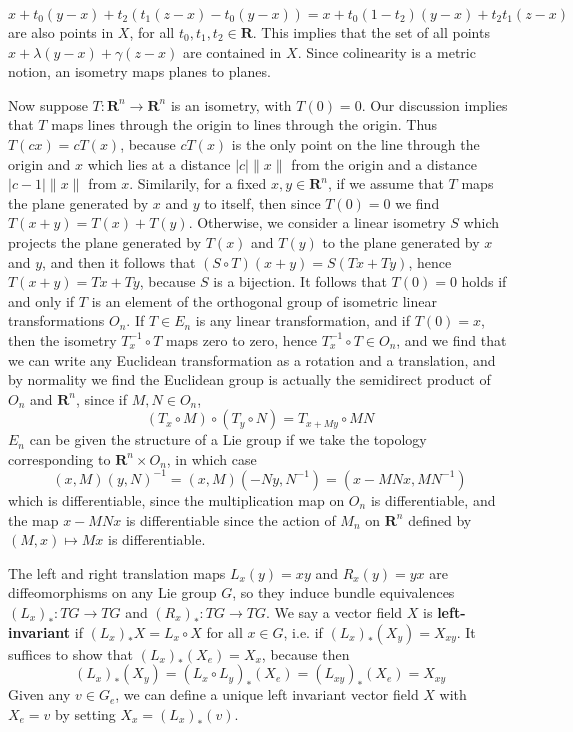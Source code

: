 %
\[ x + t_0 (y - x) + t_2 (t_1 (z - x) - t_0 (y - x)) = x + t_0 (1 - t_2) (y - x) + t_2 t_1 (z - x) \]
%
are also points in $X$, for all $t_0,t_1,t_2 \in \mathbf{R}$. This implies that the set of all points $x + \lambda (y - x) + \gamma (z - x)$ are contained in $X$. Since colinearity is a metric notion, an isometry maps planes to planes.

Now suppose $T: \mathbf{R}^n \to \mathbf{R}^n$ is an isometry, with $T(0) = 0$. Our discussion implies that $T$ maps lines through the origin to lines through the origin. Thus $T(cx) = cT(x)$, because $cT(x)$ is the only point on the line through the origin and $x$ which lies at a distance $|c|\|x\|$ from the origin and a distance $|c - 1|\|x\|$ from $x$. Similarily, for a fixed $x,y \in \mathbf{R}^n$, if we assume that $T$ maps the plane generated by $x$ and $y$ to itself, then since $T(0) = 0$ we find $T(x + y) = T(x) + T(y)$. Otherwise, we consider a linear isometry $S$ which projects the plane generated by $T(x)$ and $T(y)$ to the plane generated by $x$ and $y$, and then it follows that $(S \circ T)(x + y) = S(Tx + Ty)$, hence $T(x + y) = Tx + Ty$, because $S$ is a bijection. It follows that $T(0) = 0$ holds if and only if $T$ is an element of the orthogonal group of isometric linear transformations $O_n$. If $T \in E_n$ is any linear transformation, and if $T(0) = x$, then the isometry $T_x^{-1} \circ T$ maps zero to zero, hence $T_x^{-1} \circ T \in O_n$, and we find that we can write any Euclidean transformation as a rotation and a translation, and by normality we find the Euclidean group is actually the semidirect product of $O_n$ and $\mathbf{R}^n$, since if $M,N \in O_n$,
%
\[ (T_x \circ M) \circ (T_y \circ N) = T_{x + My} \circ MN \]
%
$E_n$ can be given the structure of a Lie group if we take the topology corresponding to $\mathbf{R}^n \times O_n$, in which case
%
\[ (x,M)(y,N)^{-1} = (x,M)(-Ny,N^{-1}) = (x - MNx,MN^{-1}) \]
%
which is differentiable, since the multiplication map on $O_n$ is differentiable, and the map $x - MNx$ is differentiable since the action of $M_n$ on $\mathbf{R}^n$ defined by $(M,x) \mapsto Mx$ is differentiable.

The left and right translation maps $L_x(y) = xy$ and $R_x(y) = yx$ are diffeomorphisms on any Lie group $G$, so they induce bundle equivalences $(L_x)_*: TG \to TG$ and $(R_x)_*: TG \to TG$. We say a vector field $X$ is {\bf left-invariant} if $(L_x)_* X = L_x \circ X$ for all $x \in G$, i.e. if $(L_x)_*(X_y) = X_{xy}$. It suffices to show that $(L_x)_*(X_e) = X_x$, because then
%
\[ (L_x)_*(X_y) = (L_x \circ L_y)_*(X_e) = (L_{xy})_*(X_e) = X_{xy} \]
%
Given any $v \in G_e$, we can define a unique left invariant vector field $X$ with $X_e = v$ by setting $X_x = (L_x)_*(v)$.

